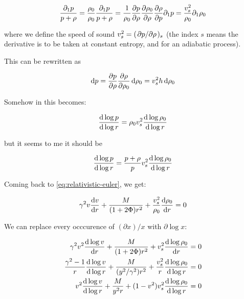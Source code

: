 \documentclass[main.tex]{subfiles}
\begin{document}
\begin{equation}
  \frac{\partial_1 p}{p + \rho} =
  \frac{\rho_0}{\rho_0} \frac{\partial_1 p}{p + \rho} =
  \frac{1}{\rho_0} \pdv{p}{\rho} \pdv{\rho_0}{\rho}
  \pdv{\rho}{p}   \partial_1 p =
  \frac{v_s^2}{\rho_0} \partial_1\rho_0
\end{equation}

where we define the speed of sound \(v_s^2 = (\pdv*{p}{\rho})_s\) (the index \(s\) means the derivative is to be taken at constant entropy, and for an adiabatic process).

This can be rewritten as

\begin{equation}
  \dd{p} = \pdv{p}{\rho} \pdv{\rho}{\rho_0} \dd{\rho_0} = v_s^2 h \dd{\rho_0}
\end{equation}

\begin{greenbox}
  Somehow in \cite[page 175]{nobili} this becomes:

  \begin{equation}
    \dv{\log p }{\log r} = \rho_0 v_s^2 \dv{\log \rho_0}{\log r }
  \end{equation}

  but it seems to me it should be

  \begin{equation}
  \dv{\log p }{\log r} = \frac{p+\rho}{p} v_s^2 \dv{\log \rho_0}{\log r }
  \end{equation}
\end{greenbox}

Coming back to \eqref{eq:relativistic-euler},  we get:

\begin{equation}
  \gamma^2 v \dv{v}{r} + \frac{M}{(1+ 2 \Phi) r^2}
  + \frac{v_s^2 }{\rho_0}\dv{\rho_0}{r} = 0
\end{equation}

We can replace every occcurence of \((\partial x) / x \) with \(\partial \log x \):

\begin{subequations}
\begin{align}
  \gamma^2 v^2 \dv{\log v}{r} + \frac{M}{(1+ 2 \Phi) r^2} + v_s^2 \dv{\log \rho_0}{r}  &= 0 \\
  \frac{\gamma^2 - 1}{r}  \dv{\log v}{\log r} + \frac{M}{(y^2/\gamma^2) r^2}
  + \frac{v_s^2}{r} \dv{\log \rho_0}{\log r}  &= 0  \\
  v^2  \dv{\log v}{\log r} + \frac{M}{y^2 r}
  + (1-v^2) v_s^2 \dv{\log \rho_0}{\log r}  &= 0
\end{align}
\end{subequations}
\end{document}
